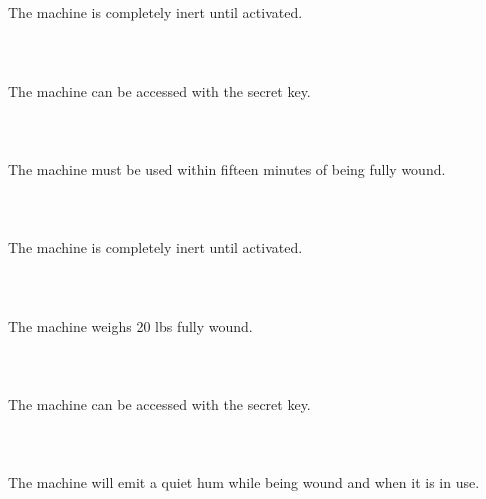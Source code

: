 \documentclass{article}
\begin{document}
    \newpage
    
    \section{}
    The machine is completely inert until activated.\\\\ 
    \newpage
    
    \section{}
    The machine can be accessed with the secret key.\\\\ 
    \newpage
    
    \section{}
    The machine must be used within fifteen minutes of being fully wound.\\\\ 
    \newpage
    
    \section{}
    The machine is completely inert until activated.\\\\ 
    \newpage
    
    \section{}
    The machine weighs 20 lbs fully wound.\\\\ 
    \newpage
    
    \section{}
    The machine can be accessed with the secret key.\\\\ 
    \newpage
    
    \section{}
    The machine will emit a quiet hum while being wound and when it is in use.\\\\ 
    \newpage
    
\end{document}

